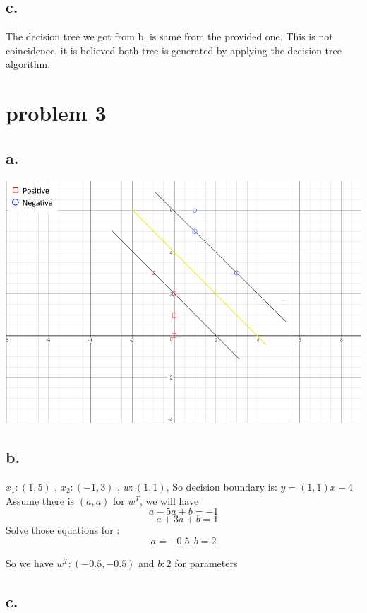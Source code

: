 \documentclass[12pt, letterpaper]{article}
\begin{document}
\subsection{c.}

The decision tree we got from b. is same from the provided one.
This is not coincidence, it is believed both tree is generated by applying the decision tree algorithm.


\section{problem 3}

\subsection{a.}
\includegraphics[scale=0.8]{"problem-3-a-copy"}

\subsection{b.}
$x_{1}:(1,5)$ , $x_{2}:(-1,3)$ , $w:(1,1)$, 
So decision boundary is: $y = (1,1)x-4$
Assume there is $(a,a)$ for $w^{T}$, we will have
$$a+5a+b=-1$$
$$-a+3a+b=1$$
Solve those equations for : $$a=-0.5,b=2$$	

So we have $w^{T}:(-0.5,-0.5)$ and $b:2$ for parameters

\subsection{c.}
\end{document}
